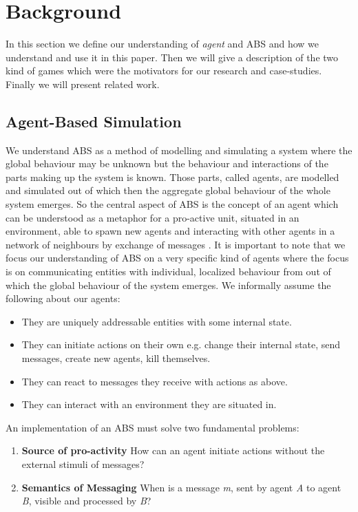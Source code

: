 \section{Background}
In this section we define our understanding of \textit{agent} and ABS and how we understand and use it in this paper. Then we will give a description of the two kind of games which were the motivators for our research and case-studies. Finally we will present related work.

\subsection{Agent-Based Simulation}
We understand ABS as a method of modelling and simulating a system where the global behaviour may be unknown but the behaviour and interactions of the parts making up the system is known. Those parts, called agents, are modelled and simulated out of which then the aggregate global behaviour of the whole system emerges. So the central aspect of ABS is the concept of an agent which can be understood as a metaphor for a pro-active unit, situated in an environment, able to spawn new agents and interacting with other agents in a network of neighbours by exchange of messages \cite{wooldridge_introduction_2009}. It is important to note that we focus our understanding of ABS on a very specific kind of agents where the focus is on communicating entities with individual, localized behaviour from out of which the global behaviour of the system emerges. We informally assume the following about our agents:

\begin{itemize}
	\item They are uniquely addressable entities with some internal state.
	\item They can initiate actions on their own e.g. change their internal state, send messages, create new agents, kill themselves.
	\item They can react to messages they receive with actions as above.
	\item They can interact with an environment they are situated in.
\end{itemize} 

An implementation of an ABS must solve two fundamental problems:

\begin{enumerate}
	\item \textbf{Source of pro-activity} How can an agent initiate actions without the external stimuli of messages?
	\item \textbf{Semantics of Messaging} When is a message \textit{m}, sent by agent \textit{A} to agent \textit{B}, visible and processed by \textit{B}?
\end{enumerate}

